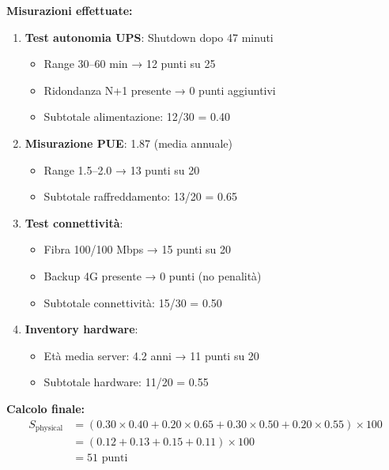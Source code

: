 \begin{tcolorbox}[title=Esempio: Punto Vendita Milano Centro]
\textbf{Misurazioni effettuate:}
\begin{enumerate}
    \item \textbf{Test autonomia UPS}: Shutdown dopo 47 minuti
    \begin{itemize}
        \item Range 30--60 min → 12 punti su 25
        \item Ridondanza N+1 presente → 0 punti aggiuntivi
        \item Subtotale alimentazione: 12/30 = 0.40
    \end{itemize}
    
    \item \textbf{Misurazione PUE}: 1.87 (media annuale)
    \begin{itemize}
        \item Range 1.5--2.0 → 13 punti su 20
        \item Subtotale raffreddamento: 13/20 = 0.65
    \end{itemize}
    
    \item \textbf{Test connettività}: 
    \begin{itemize}
        \item Fibra 100/100 Mbps → 15 punti su 20
        \item Backup 4G presente → 0 punti (no penalità)
        \item Subtotale connettività: 15/30 = 0.50
    \end{itemize}
    
    \item \textbf{Inventory hardware}: 
    \begin{itemize}
        \item Età media server: 4.2 anni → 11 punti su 20
        \item Subtotale hardware: 11/20 = 0.55
    \end{itemize}
\end{enumerate}

\textbf{Calcolo finale:}
\begin{align}
S_{\text{physical}} &= (0.30 \times 0.40 + 0.20 \times 0.65 + 0.30 \times 0.50 + 0.20 \times 0.55) \times 100 \nonumber\\
&= (0.12 + 0.13 + 0.15 + 0.11) \times 100 \nonumber\\
&= 51 \text{ punti}
\end{align}
\end{tcolorbox}

